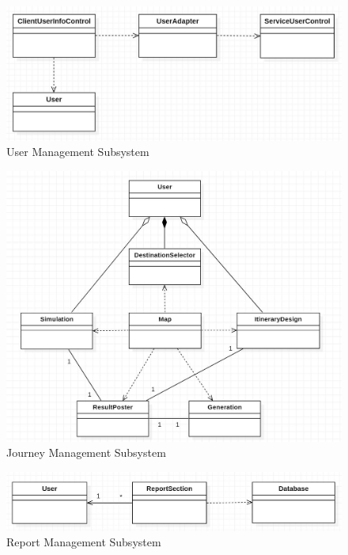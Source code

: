 \documentclass[10pt]{article}
\begin{document}
\begin{figure}[H]
    \centering
    
    \includegraphics[width=14cm]{usermanager.jpg}
    \caption{User Management Subsystem}
    \label{User Management Subsystem}
\end{figure}

\begin{figure}[H]
    \centering
    
    \includegraphics[width=14cm]{journeymanager.jpg}
    \caption{Journey Management Subsystem}
    \label{Journey Management Subsystem}
\end{figure}

\begin{figure}[H]
    \centering
    
    \includegraphics[width=14cm]{reportmanager.jpg}
    \caption{Report Management Subsystem}
    \label{Report Management Subsystem}
\end{figure}
\end{document}
